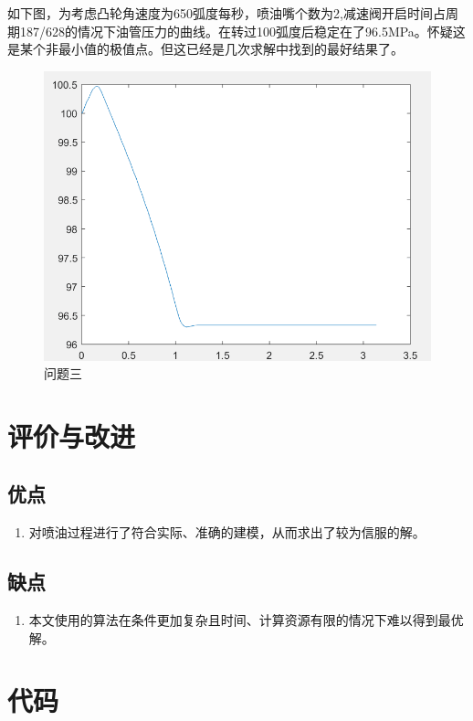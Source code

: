 \documentclass{article}
\newcounter{sub}
\begin{document}
如下图，为考虑凸轮角速度为650弧度每秒，喷油嘴个数为2,减速阀开启时间占周期187/628的情况下油管压力的曲线。在转过100弧度后稳定在了96.5MPa。怀疑这是某个非最小值的极值点。但这已经是几次求解中找到的最好结果了。

\begin{figure}[H]
	\centering
	\includegraphics[width=0.5\linewidth]{3.png}
	\caption{问题三}
	\label{fig:问题三}
\end{figure}

\section{评价与改进}%
\label{sec:评价与改进}

\subsection{优点}
\begin{enumerate}
	\item 对喷油过程进行了符合实际、准确的建模，从而求出了较为信服的解。
\end{enumerate}
\subsection{缺点}
\begin{enumerate}
	\item 本文使用的算法在条件更加复杂且时间、计算资源有限的情况下难以得到最优解。
\end{enumerate}






\renewcommand{\thesection}{\Alph{section}~}

\appendix

\section{代码}%
\label{sec:代码}
\end{document}
